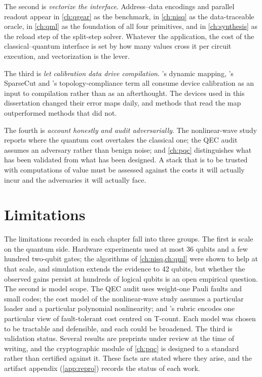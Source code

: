 The second is \emph{vectorize the interface}. Address--data encodings and parallel readout appear in \cref{ch:qgear} as the \qcrank{} benchmark, in \cref{ch:nisq} as the data-traceable oracle, in \cref{ch:qml} as the foundation of all four primitives, and in \cref{ch:synthesis} as the reload step of the split-step solver. Whatever the application, the cost of the classical--quantum interface is set by how many values cross it per circuit execution, and vectorization is the lever.

The third is \emph{let calibration data drive compilation}. \deal's dynamic mapping, \shardq's SparseCut and \rubriq's topology-compliance term all consume device calibration as an input to compilation rather than as an afterthought. The devices used in this dissertation changed their error maps daily, and methods that read the map outperformed methods that did not.

The fourth is \emph{account honestly and audit adversarially}. The nonlinear-wave study reports where the quantum cost overtakes the classical one; the QEC audit assumes an adversary rather than benign noise; and \cref{ch:pqc} distinguishes what has been validated from what has been designed. A stack that is to be trusted with computations of value must be assessed against the costs it will actually incur and the adversaries it will actually face.

\section{Limitations}\label{sec:conclusion:limitations}

The limitations recorded in each chapter fall into three groups. The first is scale on the quantum side. Hardware experiments used at most 36 qubits and a few hundred two-qubit gates; the algorithms of \cref{ch:nisq,ch:qml} were shown to help at that scale, and simulation extends the evidence to 42 qubits, but whether the observed gains persist at hundreds of logical qubits is an open empirical question. The second is model scope. The QEC audit uses weight-one Pauli faults and small codes; the cost model of the nonlinear-wave study assumes a particular loader and a particular polynomial nonlinearity; and \rubriq's rubric encodes one particular view of fault-tolerant cost centred on T-count. Each model was chosen to be tractable and defensible, and each could be broadened. The third is validation status. Several results are preprints under review at the time of writing, and the cryptographic module of \cref{ch:pqc} is designed to a standard rather than certified against it. These facts are stated where they arise, and the artifact appendix (\cref{app:repro}) records the status of each work.

